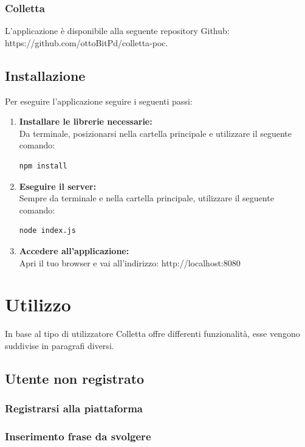 \documentclass[11pt,a4paper]{article}
\begin{document}
{	\subsubsection{Colletta}		
	L'applicazione è disponibile alla seguente repository Github:
	https://github.com/ottoBitPd/colletta-poc.
	
	\subsection{Installazione}
	Per eseguire l'applicazione seguire i seguenti passi:
	 \begin{enumerate}
	 	\item \textbf{Installare le librerie necessarie:}\\ Da terminale, posizionarsi nella cartella principale e utilizzare il seguente comando:\begin{lstlisting}[numbers=none]
	 	npm install
	 	\end{lstlisting}
	 	\item \textbf{Eseguire il server:}\\ Sempre da terminale e nella cartella principale, utilizzare il seguente comando:\begin{lstlisting}[numbers=none]
	 	node index.js
	 	\end{lstlisting}
	 	\item \textbf{Accedere all'applicazione:}\\ Apri il tuo browser e vai all'indirizzo: http://localhost:8080
	 \end{enumerate}
 
 \newpage
	\section{Utilizzo}	
	In base al tipo di utilizzatore Colletta offre differenti funzionalità, esse vengono suddivise in paragrafi diversi.
	
	\subsection{Utente non registrato}
		\subsubsection{Registrarsi alla piattaforma}
		\subsubsection{Inserimento frase da svolgere}
}
\end{document}

